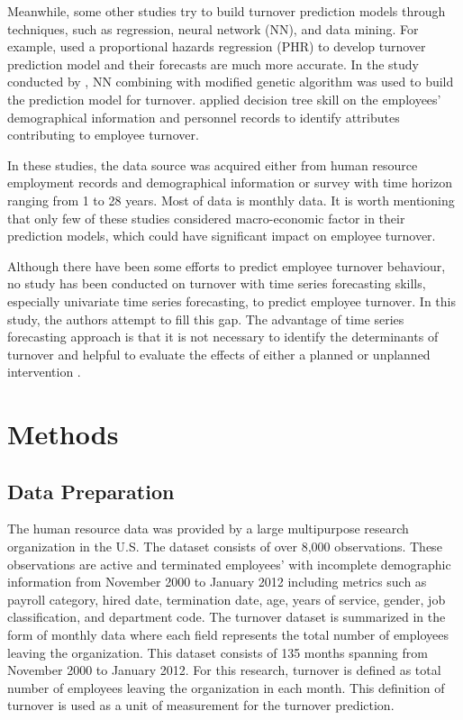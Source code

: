 Meanwhile, some other studies try to build turnover prediction models through techniques, such as regression, neural network (NN), and data mining. For example, \citet{ng1991} used a proportional hazards regression (PHR) to develop turnover prediction model and their forecasts are much more accurate. In the study conducted by \citet{sexton2005}, NN combining with modified genetic algorithm was used to build the prediction model for turnover. \citet{alao2013} applied decision tree skill on the employees’ demographical information and personnel records to identify attributes contributing to employee turnover.

In these studies, the data source was acquired either from human resource employment records and demographical information or survey with time horizon ranging from 1 to 28 years. Most of data is monthly data. It is worth mentioning that only few of these studies considered macro-economic factor in their prediction models, which could have significant impact on employee turnover.

Although there have been some efforts to predict employee turnover behaviour, no study has been conducted on turnover with time series forecasting skills, especially univariate time series forecasting, to predict employee turnover. In this study, the authors attempt to fill this gap. The advantage of time series forecasting approach is that it is not necessary to identify the determinants of turnover and helpful to evaluate the effects of either a planned or unplanned intervention \citep{velicer2003}.  

\section{Methods}
\subsection{Data Preparation}
The human resource data was provided by a large multipurpose research organization in the U.S. The dataset consists of over 8,000 observations. These observations are active and terminated employees’ with incomplete demographic information from November 2000 to January 2012 including metrics such as payroll category, hired date, termination date, age, years of service, gender, job classification, and department code. The turnover dataset is summarized in the form of monthly data where each field represents the total number of employees leaving the organization. This dataset consists of 135 months spanning from November 2000 to January 2012. For this research, turnover is defined as total number of employees leaving the organization in each month. This definition of turnover is used as a unit of measurement for the turnover prediction. 

